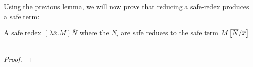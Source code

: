

Using the previous lemma, we will now prove that reducing a
safe-redex produces a safe term:

\begin{lem}
\label{va_lem:safereduction} A safe redex $(\lambda \overline{x} . M )
\overline{N}$ where the $N_i$ are safe reduces to the safe term
$M\left[ \overline{N}/\overline{x} \right]$.
\end{lem}

\begin{proof}
\end{proof}




